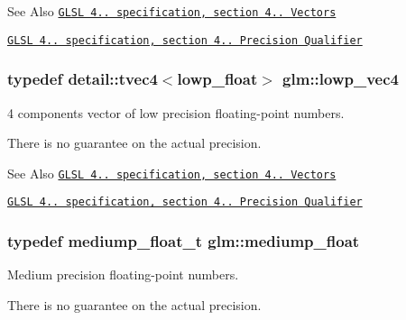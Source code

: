 \begin{DoxySeeAlso}{See Also}
\href{http://www.opengl.org/registry/doc/GLSLangSpec.4.20.8.pdf}{\tt G\-L\-S\-L 4.. specification, section 4.. Vectors} 

\href{http://www.opengl.org/registry/doc/GLSLangSpec.4.20.8.pdf}{\tt G\-L\-S\-L 4.. specification, section 4.. Precision Qualifier} 
\end{DoxySeeAlso}
\hypertarget{group__core__precision_gabc7a12b5fe2a8b5b4d11961c284637dc}{
\subsubsection[{lowp\-\_\-vec4}]{\setlength{\rightskip}{0pt plus 5cm}typedef detail\-::tvec4$<$lowp\-\_\-float$>$ {\bf glm\-::lowp\-\_\-vec4}}}\label{group__core__precision_gabc7a12b5fe2a8b5b4d11961c284637dc}


4 components vector of low precision floating-\/point numbers. 

There is no guarantee on the actual precision.

\begin{DoxySeeAlso}{See Also}
\href{http://www.opengl.org/registry/doc/GLSLangSpec.4.20.8.pdf}{\tt G\-L\-S\-L 4.. specification, section 4.. Vectors} 

\href{http://www.opengl.org/registry/doc/GLSLangSpec.4.20.8.pdf}{\tt G\-L\-S\-L 4.. specification, section 4.. Precision Qualifier} 
\end{DoxySeeAlso}
\hypertarget{group__core__precision_gac785826c039fe6c97c03b37c81c1a68e}{
\subsubsection[{mediump\-\_\-float}]{\setlength{\rightskip}{0pt plus 5cm}typedef mediump\-\_\-float\-\_\-t {\bf glm\-::mediump\-\_\-float}}}\label{group__core__precision_gac785826c039fe6c97c03b37c81c1a68e}


Medium precision floating-\/point numbers. 

There is no guarantee on the actual precision.

